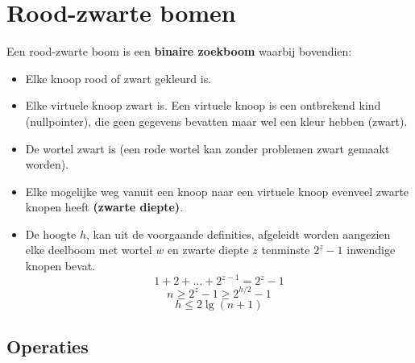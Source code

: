 \documentclass{report}
\begin{document}
	\section{Rood-zwarte bomen}
	Een rood-zwarte boom is een \textbf{binaire zoekboom} waarbij bovendien:
	\begin{itemize}
		\item Elke knoop rood of zwart gekleurd is.
		\item Elke virtuele knoop zwart is. Een virtuele knoop is een ontbrekend kind (nullpointer), die geen gegevens bevatten maar wel een kleur hebben (zwart).
		\item De wortel zwart is (een rode wortel kan zonder problemen zwart gemaakt worden).
		\item Elke mogelijke weg vanuit een knoop naar een virtuele knoop evenveel zwarte knopen heeft \textbf{(zwarte diepte)}.
		\item De hoogte $h$, kan uit de voorgaande definities, afgeleidt worden aangezien elke deelboom met wortel $w$ en zwarte diepte $z$ tenminste $2^z - 1$ inwendige knopen bevat. 
		$$1 + 2 + ... + 2^{z - 1} = 2^z - 1$$ 
		$$n \geq 2^z - 1 \geq 2^{h/2} - 1$$
		$$h \leq 2\lg(n + 1)$$
	\end{itemize}
	\subsection{Operaties}
\end{document}
